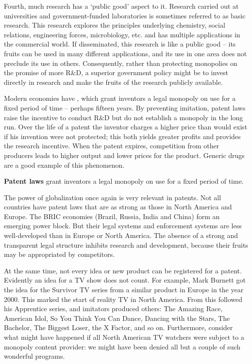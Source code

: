 Fourth, much research has a `public good' aspect to it. Research carried out at universities and government-funded laboratories is sometimes referred to as basic research. This research explores the principles underlying chemistry, social relations, engineering forces, microbiology, etc. and has multiple applications in the commercial world. If disseminated, this research is like a public good -- its fruits can be used in many different applications, and its use in one area does not preclude its use in others. Consequently, rather than protecting monopolies on the promise of more R\&D, a superior government policy might be to invest directly in research and make the fruits of the research publicly available.

Modern economies have , which grant inventors a legal monopoly on use for a fixed period of time -- perhaps fifteen years. By preventing imitation, patent laws raise the incentive to conduct R\&D but do not establish a monopoly in the long run. Over the life of a patent the inventor charges a higher price than would exist if his invention were not protected; this both yields greater profits and provides the research incentive. When the patent expires, competition from other producers leads to higher output and lower prices for the product. Generic drugs are a good example of this phenomenon. 

\begin{DefBox}
\textbf{Patent laws} grant inventors a legal monopoly on use for a fixed period of time.
\end{DefBox}

The power of globalization once again is very relevant in patents. Not all countries have patent laws that are as strong as those in North America and Europe. The BRIC economies (Brazil, Russia, India and China) form an emerging power block. But their legal systems and enforcement systems are less well-developed than in Europe or North America. The absence of a strong and transparent legal structure inhibits research and development, because their fruits may be appropriated by competitors. 

At the same time, not every idea or new product can be registered for a patent. Evidently an idea for a TV show does not count. For example, Mark Burnett got the idea for the Survivor TV series from a similar product in Europe in the year 2000. This marked the start of reality TV in North America.  From this followed his Apprentice series, and imitators produced others: The Amazing Race, American Idol, So You Think You Can Dance, Dancing with the Stars, The Bachelor, The Biggest Loser, the X Factor, and so on. Furthermore, consider what might have happened if all North American TV watchers were subject to a monopoly content provider: we might have been denied all but a couple of such wonderful programs. 

